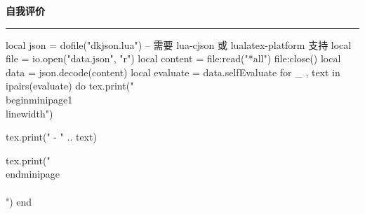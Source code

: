 \documentclass[10pt, a4paper, oneside]{ctexart}
\begin{document}
\ifdefined\selfEvaluate
\begin{minipage}{1\textwidth}
    \large{\ifdefined\showIcon \makebox[\iconAlignWide][c]{\faCommentDots} \fi \textbf{自我评价}}
\end{minipage}
\rule{\linewidth}{\lineSize}
\begin{center}
    \begin{minipage}{0.9\textwidth}
        \begin{luacode}
            local json = dofile("dkjson.lua")  -- 需要 lua-cjson 或 lualatex-platform 支持
            local file = io.open("data.json", "r")
            local content = file:read("*all")
            file:close()
            local data = json.decode(content)
            local evaluate = data.selfEvaluate
            for _ , text in ipairs(evaluate) do
                tex.print("\\begin{minipage}{1\\linewidth}")

                tex.print(" - " .. text)

                tex.print("\\end{minipage}\\\\[0.5em]")
            end
        \end{luacode}
    \end{minipage}
\end{center}
\fi
\end{document}
